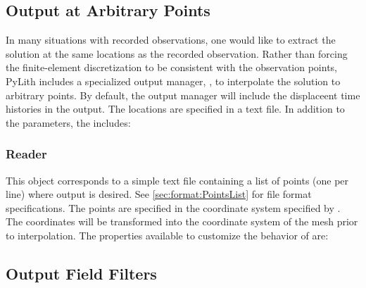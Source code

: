\subsection{Output at Arbitrary Points}
\label{sec:output:points}

In many situations with recorded observations, one would like to
extract the solution at the same locations as the recorded
observation. Rather than forcing the finite-element discretization to
be consistent with the observation points, PyLith includes a
specialized output manager, , to interpolate
the solution to arbitrary points. By default, the output manager will
include the displaceent time histories in the output. The locations
are specified in a text file. In addition to the
 parameters, the 
includes:
\begin{inventory}
\end{inventory}

\subsubsection{ Reader}

This object corresponds to a simple text file containing a list of
points (one per line) where output is desired. See \vref{sec:format:PointsList}
for file format specifications. The points are specified in the coordinate
system specified by . The coordinates will be transformed
into the coordinate system of the mesh prior to interpolation. The
properties available to customize the behavior of 
are:
\begin{inventory}
\end{inventory}

\subsection{Output Field Filters}

